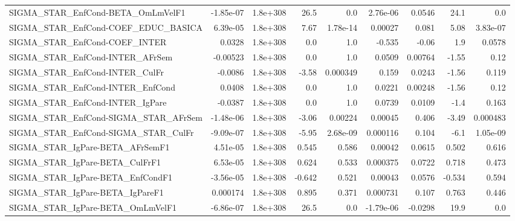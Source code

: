 \begin{tabular}{lrrrrrrrr}
SIGMA\_STAR\_EnfCond-BETA\_OmLmVelF1     &   -1.85e-07 &     1.8e+308 &    26.5 &      0.0 &   2.76e-06 &      0.0546 &         24.1 &           0.0 \\
SIGMA\_STAR\_EnfCond-COEF\_EDUC\_BASICA   &    6.39e-05 &     1.8e+308 &    7.67 & 1.78e-14 &    0.00027 &       0.081 &         5.08 &      3.83e-07 \\
SIGMA\_STAR\_EnfCond-COEF\_INTER         &      0.0328 &     1.8e+308 &     0.0 &      1.0 &     -0.535 &       -0.06 &          1.9 &        0.0578 \\
SIGMA\_STAR\_EnfCond-INTER\_AFrSem       &    -0.00523 &     1.8e+308 &     0.0 &      1.0 &     0.0509 &     0.00764 &        -1.55 &          0.12 \\
SIGMA\_STAR\_EnfCond-INTER\_CulFr        &     -0.0086 &     1.8e+308 &   -3.58 & 0.000349 &      0.159 &      0.0243 &        -1.56 &         0.119 \\
SIGMA\_STAR\_EnfCond-INTER\_EnfCond      &      0.0408 &     1.8e+308 &     0.0 &      1.0 &     0.0221 &     0.00248 &        -1.56 &          0.12 \\
SIGMA\_STAR\_EnfCond-INTER\_IgPare       &     -0.0387 &     1.8e+308 &     0.0 &      1.0 &     0.0739 &      0.0109 &         -1.4 &         0.163 \\
SIGMA\_STAR\_EnfCond-SIGMA\_STAR\_AFrSem  &   -1.48e-06 &     1.8e+308 &   -3.06 &  0.00224 &    0.00045 &       0.406 &        -3.49 &      0.000483 \\
SIGMA\_STAR\_EnfCond-SIGMA\_STAR\_CulFr   &   -9.09e-07 &     1.8e+308 &   -5.95 & 2.68e-09 &   0.000116 &       0.104 &         -6.1 &      1.05e-09 \\
SIGMA\_STAR\_IgPare-BETA\_AFrSemF1       &    4.51e-05 &     1.8e+308 &   0.545 &    0.586 &    0.00042 &      0.0615 &        0.502 &         0.616 \\
SIGMA\_STAR\_IgPare-BETA\_CulFrF1        &    6.53e-05 &     1.8e+308 &   0.624 &    0.533 &   0.000375 &      0.0722 &        0.718 &         0.473 \\
SIGMA\_STAR\_IgPare-BETA\_EnfCondF1      &   -3.56e-05 &     1.8e+308 &  -0.642 &    0.521 &    0.00043 &      0.0576 &       -0.534 &         0.594 \\
SIGMA\_STAR\_IgPare-BETA\_IgPareF1       &    0.000174 &     1.8e+308 &   0.895 &    0.371 &   0.000731 &       0.107 &        0.763 &         0.446 \\
SIGMA\_STAR\_IgPare-BETA\_OmLmVelF1      &   -6.86e-07 &     1.8e+308 &    26.5 &      0.0 &  -1.79e-06 &     -0.0298 &         19.9 &           0.0 \\

\end{tabular}
